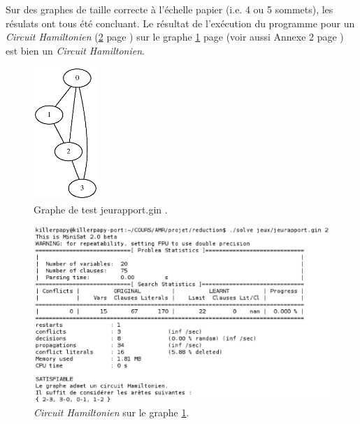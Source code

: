   \indent Sur des graphes de taille correcte à l'échelle papier (i.e. 4
  ou 5 sommets), les résulats ont tous été concluant. Le résultat de
  l'exécution du programme pour un \emph{Circuit Hamiltonien} (\ref{ham}
  page \pageref{ham}) sur le graphe \ref{graphe1} page \pageref{graphe1} 
  (voir aussi Annexe 2 page \pageref{an2}) est bien un \emph{Circuit
  Hamiltonien}.

  \begin{figure}[!ht]
   \begin{center}
    \includegraphics[height=5cm]{images/jeurap.ps}
    \caption{Graphe de test jeurapport.gin .\label{graphe1}}
   \end{center}
  \end{figure}

  \begin{figure}[!ht]
   \begin{center}
    \includegraphics[width=12cm]{images/chemin.eps}
    \caption{\emph{Circuit Hamiltonien} sur le graphe
    \ref{graphe1}.\label{ham}}
   \end{center}
  \end{figure}